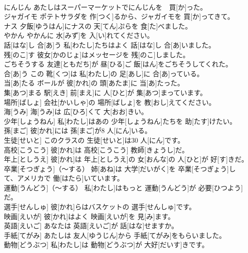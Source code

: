 \documentclass[8pt]{extreport}
\begin{document}
\begin{CJK}{UTF8}{min}
\\	にんじん	あたしはスーパーマーケットでにんじんを　買[か]った。		
\\	ジャガイモ	ポテトサラダを 作[つく]るから、ジャガイモを 買[か]ってきて。		
\\	ナス	夕飯[ゆうはん]にナスの 天[てん]ぷらを 食[た]べました。		
\\	やかん	やかんに 水[みず]を 入[い]れてください。		
\\	話[はな]し 合[あ]う	私[わたし]たちはよく 話[はな]し 合[あ]いました。		
\\	残[のこ]す	彼女[かのじょ]はメッセージを 残[のこ]しました。		
\\	ごちそうする	友達[ともだち]が 昼[ひる]ご 飯[はん]をごちそうしてくれた。		
\\	合[あ]う	この 靴[くつ]は 私[わたし]の 足[あし]に 合[あ]っている。		
\\	当[あ]たる	ボールが 彼[かれ]の 頭[あたま]に 当[あ]たった。		
\\	集[あつ]まる	駅[えき] 前[まえ]に 人[ひと]が 集[あつ]まっています。		
\\	場所[ばしょ]	会社[かいしゃ]の 場所[ばしょ]を 教[おし]えてください。		
\\	海[うみ]	海[うみ]は 広[ひろ]くて 大[おお]きい。		
\\	少年[しょうねん]	私[わたし]はあの 少年[しょうねん]たちを 助[たす]けたい。		
\\	孫[まご]	彼[かれ]には 孫[まご]が8 人[にん]いる。		
\\	生徒[せいと]	このクラスの 生徒[せいと]は30 人[にん]です。		
\\	高校[こうこう]	彼[かれ]は 高校[こうこう] 教師[きょうし]だ。		
\\	年上[としうえ]	彼[かれ]は 年上[としうえ]の 女[おんな]の 人[ひと]が 好[す]きだ。		
\\	卒業[そつぎょう]（～する）	姉[あね]は 大学[だいがく]を 卒業[そつぎょう]して、アメリカで 働[はたら]いています。		
\\	運動[うんどう]（～する）	私[わたし]はもっと 運動[うんどう]が 必要[ひつよう]だ。		
\\	選手[せんしゅ]	彼[かれ]らはバスケットの 選手[せんしゅ]です。		
\\	映画[えいが]	彼[かれ]はよく 映画[えいが]を 見[み]ます。		
\\	英語[えいご]	あなたは 英語[えいご]が 話[はな]せますか。		
\\	手紙[てがみ]	あたしは 友人[ゆうじん]から 手紙[てがみ]をもらいました。		
\\	動物[どうぶつ]	私[わたし]は 動物[どうぶつ]が 大好[だいす]きです。		

\end{CJK}
\end{document}
